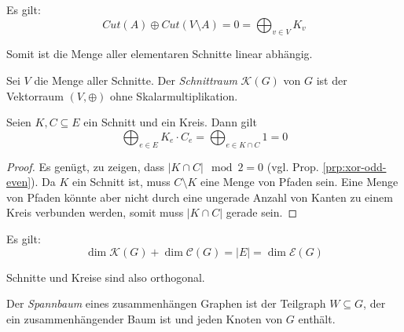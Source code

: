 \begin{corollary}
    Es gilt:
    \begin{equation*}
        Cut(A) \oplus Cut(V \setminus A) = 0 = \bigoplus_{v \in V} K_v
    \end{equation*}

    Somit ist die Menge aller elementaren Schnitte linear abhängig.
\end{corollary}

\begin{definition}[Schnittraum]
    Sei $ V $ die Menge aller Schnitte.
    Der \textit{Schnittraum} $ \mathcal{K}(G) $ von $ G $ ist der Vektorraum $ (V, \oplus) $ ohne Skalarmultiplikation.
\end{definition}

\begin{proposition}
    Seien $ K, C \subseteq E $ ein Schnitt und ein Kreis.
    Dann gilt
    \begin{equation*}
        \bigoplus_{e \in E} K_e \cdot C_e = \bigoplus_{e \in K \cap C} 1 = 0
    \end{equation*}
\end{proposition}

\begin{proof}
    Es genügt, zu zeigen, dass $ |K \cap C| \mod 2 = 0 $ (vgl. Prop. \ref{prp:xor-odd-even}).
    Da $ K $ ein Schnitt ist, muss $ C \setminus K $ eine Menge von Pfaden sein.
    Eine Menge von Pfaden könnte aber nicht durch eine ungerade Anzahl von Kanten zu einem Kreis verbunden werden, somit muss $ |K \cap C| $ gerade sein.
\end{proof}

\begin{proposition}
    Es gilt:
    \begin{equation*}
        \dim \mathcal{K}(G) + \dim \mathcal{C}(G) = |E| = \dim \mathcal{E}(G)
    \end{equation*}
\end{proposition}

\begin{remark}
    Schnitte und Kreise sind also orthogonal.
\end{remark}

\begin{definition}[Spannbaum]
    Der \textit{Spannbaum} eines zusammenhängen Graphen ist der Teilgraph $ W \subseteq G $, der ein zusammenhängender Baum ist und jeden Knoten von $ G $ enthält.
\end{definition}

